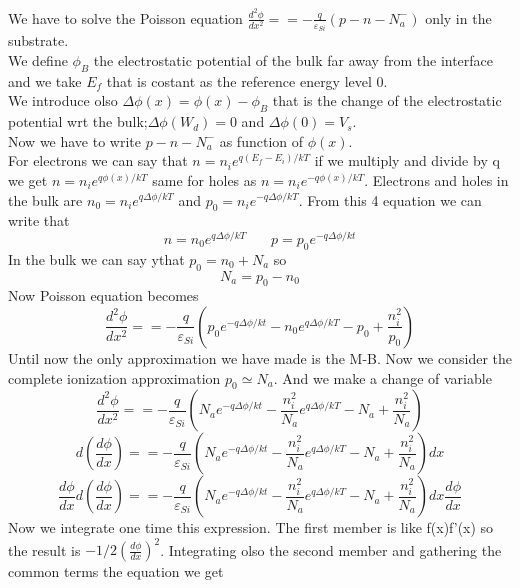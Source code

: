 We have to solve the Poisson equation $\frac{d^2\phi}{dx^2}==-\frac{q}{\varepsilon_{Si}}(p-n-N_a^-)$ only in the substrate.\\
We define $\phi_B$ the electrostatic potential of the bulk far away from the interface and we take $E_f$ that is costant as the reference energy level 0.\\
We introduce olso $\Delta \phi (x)=\phi(x)-\phi_B$  that is the change of the electrostatic potential wrt the bulk;$\Delta \phi (W_d)=0$ and $\Delta \phi (0)=V_s$.\\
Now we have to write $p-n-N_a^-$ as function of $\phi(x)$.\\
For electrons we can say that $n=n_ie^{q(E_f-E_i)/kT}$ if we multiply and divide by q we get $n=n_ie^{q\phi(x)/kT}$ same for holes as $n=n_ie^{-q\phi(x)/kT}$. Electrons and holes in the bulk are $n_0=n_ie^{q\Delta \phi/kT}$ and $p_0=n_ie^{-q\Delta \phi/kT}$. From this 4 equation we can write that 
\begin{equation}
n=n_0e^{q\Delta \phi/kT} \ \ \ \ \ \ \ \ p=p_0e^{-q\Delta \phi/kt}
\end{equation}
In the bulk we can say ythat $p_0=n_0+N_a$ so 
\begin{equation}
N_a=p_0-n_0
\end{equation}
Now Poisson equation becomes 
\begin{equation}
\frac{d^2\phi}{dx^2}==-\frac{q}{\varepsilon_{Si}}(p_0e^{-q\Delta \phi/kt}-n_0e^{q\Delta \phi/kT}-p_0+\frac{n_i^2}{p_0})
\end{equation}
Until now the only approximation we have made is the M-B. Now we consider the complete ionization approximation $p_0\simeq N_a$. And we make a change of variable 
\begin{equation}
\frac{d^2\phi}{dx^2}==-\frac{q}{\varepsilon_{Si}}(N_ae^{-q\Delta \phi/kt}-\frac{n_i^2}{N_a}e^{q\Delta \phi/kT}-N_a+\frac{n_i^2}{N_a})
\end{equation}
\begin{equation}
d(\frac{d\phi}{dx})==-\frac{q}{\varepsilon_{Si}}(N_ae^{-q\Delta \phi/kt}-\frac{n_i^2}{N_a}e^{q\Delta \phi/kT}-N_a+\frac{n_i^2}{N_a})dx
\end{equation}
\begin{equation}
\frac{d\phi}{dx}d(\frac{d\phi}{dx})==-\frac{q}{\varepsilon_{Si}}(N_ae^{-q\Delta \phi/kt}-\frac{n_i^2}{N_a}e^{q\Delta \phi/kT}-N_a+\frac{n_i^2}{N_a})dx\frac{d\phi}{dx}
\end{equation}
Now we integrate one time this expression. The first member is like f(x)f'(x) so the result is $-1/2(\frac{d\phi}{dx})^2$. Integrating olso the second member and gathering the common terms the equation we get

